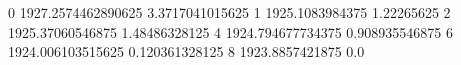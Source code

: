 0 1927.2574462890625 3.3717041015625
1 1925.1083984375 1.22265625
2 1925.37060546875 1.48486328125
4 1924.794677734375 0.908935546875
6 1924.006103515625 0.120361328125
8 1923.8857421875 0.0
